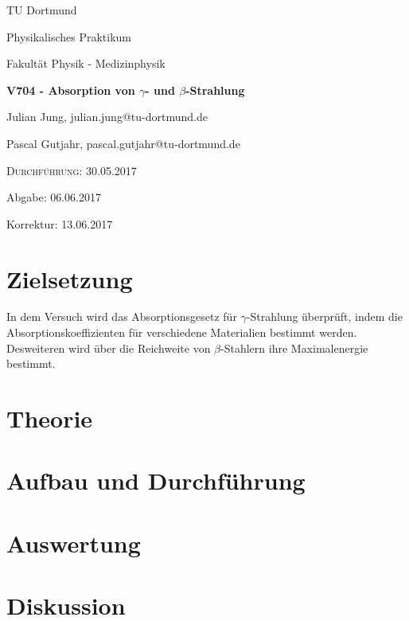 

  
  \begin{titlepage}
    \centering
    {\LARGE TU Dortmund \par}
    \vspace{0.75cm}
    {\Large Physikalisches Praktikum \par}
    \vspace{0.75cm}
    {\Large Fakultät Physik - Medizinphysik \par}
    \vspace{4cm}
    {\LARGE \bfseries V704 - Absorption von $\gamma$- und $\beta$-Strahlung \par}
    \vspace{4cm}
    {\large Julian Jung, julian.jung@tu-dortmund.de \par \vspace{0.25cm}
    Pascal Gutjahr, pascal.gutjahr@tu-dortmund.de \par}
    \vspace{6cm}
    {\scshape Durchführung: 30.05.2017 \par \vspace{0.25cm}
    Abgabe: 06.06.2017 \par \vspace{0.25cm}
    Korrektur: 13.06.2017}
  \end{titlepage}
\newpage
\tableofcontents
\newpage
\section{Zielsetzung}
In dem Versuch wird das Absorptionsgesetz für $\gamma$-Strahlung überprüft,
indem die Absorptionskoeffizienten für verschiedene Materialien bestimmt werden.
Desweiteren wird über die Reichweite von $\beta$-Stahlern ihre Maximalenergie
bestimmt.
\section{Theorie}
 
\section{Aufbau und Durchführung}
 
\section{Auswertung}
 
\section{Diskussion}
 
\printbibliography


